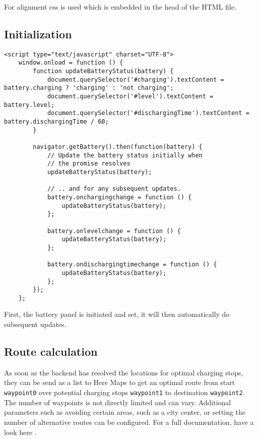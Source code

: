 For alignment css is used which is embedded in the head of the HTML file.

\subsection{Initialization}

\begin{verbatim}
<script type="text/javascript" charset="UTF-8">
    window.onload = function () {
        function updateBatteryStatus(battery) {
            document.querySelector('#charging').textContent = battery.charging ? 'charging' : 'not charging';
            document.querySelector('#level').textContent = battery.level;
            document.querySelector('#dischargingTime').textContent = battery.dischargingTime / 60;
        }

        navigator.getBattery().then(function(battery) {
            // Update the battery status initially when
            // the promise resolves
            updateBatteryStatus(battery);

            // .. and for any subsequent updates.
            battery.onchargingchange = function () {
                updateBatteryStatus(battery);
            };

            battery.onlevelchange = function () {
                updateBatteryStatus(battery);
            };

            battery.ondischargingtimechange = function () {
                updateBatteryStatus(battery);
            };
        });
    };
\end{verbatim}

First, the battery panel is initiated and set, it will then automatically do subsequent updates. 


\subsection{Route calculation}

As soon as the backend has resolved the locations for optimal charging stops, they can be send as a list to Here Maps to get an optimal route from start \texttt{waypoint0} over potential charging stops \texttt{waypoint1} to destination \texttt{waypoint2}. The number of waypoints is not directly limited and can vary. Additional parameters such as avoiding certain areas, such as a city center, or setting the number of alternative routes can be configured. For a full documentation, have a look here \cite{driver-13}.

